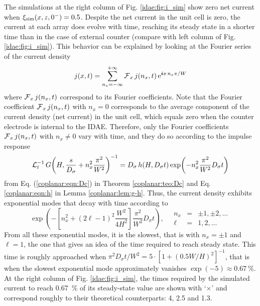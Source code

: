 The simulations at the right column of Fig. \ref{idae:fig:i_sim} show zero net current when $\xi_{\mathrm{sim}}(x,z,0^{-}) = \num{0,5}$.
Despite the net current in the unit cell is zero,
the current at each array does evolve with time,
reaching its steady state in a shorter time than in the case of external counter
(compare with left column of Fig. \ref{idae:fig:i_sim}).
This behavior can be explained by looking at the Fourier series of the current density
\begin{equation}
	j(x,t) = \sum_{n_{x}=-\infty}^{+\infty} \operatorname{\mathcal{F}}_{x} j(n_{x},t) \operatorname{e}^{\bm{i} x\, n_{x} \pi/W}
\end{equation}
where $\operatorname{\mathcal{F}}_{x} j(n_{x},t)$ correspond to its Fourier coefficients.
Note that the Fourier coefficient $\operatorname{\mathcal{F}}_{x} j(n_{x},t)$ with $n_{x}=0$
corresponds to the average component of the current density (net current) in the unit cell,
which equals zero when the counter electrode is internal to the IDAE.
Therefore, only the Fourier coefficients $\operatorname{\mathcal{F}}_{x} j(n_{x},t)$ with $n_{x} \neq 0$ vary with time,
and they do so according to the impulse response
\begin{equation}
	\label{idae:eqn:h}
	\operatorname{\mathcal{L}}_{t}^{-1} G\!\left( H, \frac{s}{D_{\sigma}} + n_{x}^{2} \frac{\pi^{2}}{W^{2}} \right)^{-1}
	=
	D_{\sigma}\,
	h(H,D_{\sigma} t) \exp\!\left( -n_{x}^{2} \frac{\pi^{2}}{W^{2}} D_{\sigma} t \right)
\end{equation}
from Eq. (\ref{coplanar:eqn:Dc}) in Theorem \ref{coplanar:teo:Dc}
and Eq. \eqref{coplanar:eqn:h} in Lemma \ref{coplanar:lem:g-h}.
Thus, the current density exhibits exponential modes that decay with time according to
\begin{equation}
	\label{idae:eqn:tau:intC}
	\exp\!\left( -\left[ n_{x}^{2} + (2\ell - 1)^{2} \frac{W^{2}}{4H^{2}} \right] \frac{\pi^{2}}{W^{2}} D_{\sigma} t \right),\quad 
	\begin{array}{rcl}
		n_{x} &=& \pm 1, \pm 2, \ldots \\
		\ell &=& 1, 2, \ldots
	\end{array}
\end{equation}
From all these exponential modes,
it is the slowest, that is with $n_{x} = \pm 1$ and $\ell=1$,
the one that gives an idea of the time required to reach steady state.
This time is roughly approached when $\pi^{2} D_{\sigma} t/W^{2} = 5 \cdot [1 + (\num{0,5} W/H)^{2}]^{-1}$,
that is when the slowest exponential mode approximately vanishes $\exp(-5) \approx \SI{0,67}{\percent}$.
At the right column of Fig. \ref{idae:fig:i_sim},
the times required by the simulated current
to reach \SI{0,67}{\percent} of its steady-state value are shown with `$\times$'
and correspond roughly to their theoretical counterparts: 4, \num{2,5} and \num{1,3}.

